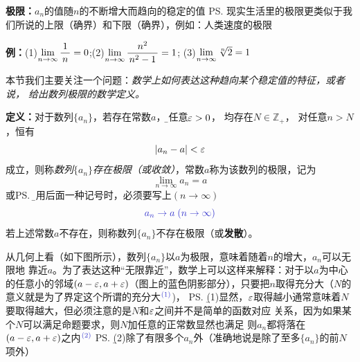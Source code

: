 {\bf 极限：}$a_n$的值随$n$的不断增大而趋向的稳定的值
\ps{现实生活里的极限更类似于我们所说的上限（确界）和下限（确界），例如：人类速度的极限} 

{\bf 例：}(1)$\lim\limits_{n\to\infty}\displaystyle\frac{\,{1}\,}{\,{n}\,}=0$;\quad(2)$\lim\limits_{n\to\infty}\displaystyle\frac{\,{n^2}\,}{\,{n^2-1}\,}=1$;
\quad(3)$\lim\limits_{n\to\infty}\sqrt[n]2=1$

\bigskip

本节我们主要关注一个问题：{\it 数学上如何表达这种趋向某个稳定值的特征，或者说，
给出数列极限的数学定义。}

{\bf 定义：}对于数列$\{a_n\}$，若存在常数$a$，{\b 对任意$\varepsilon>0$，
均存在$N\in\mathbb{Z}_+$，
对任意$n>N$，恒有
$$|a_n-a|<\varepsilon$$
成立}，则称{\it 数列$\{a_n\}$存在极限（或收敛）}，常数$a$称为该数列的极限，记为
$$\lim_{n\to\infty}a_n=a$$
或\ps{\b 使用后面一种记号时，必须要写上$(n\to\infty)$}
$${\b a_n\to a\;(n\to\infty)}$$
若上述常数$a$不存在，则称数列$\{a_n\}$不存在极限（或{\bf 发散}）。

从几何上看（如下图所示），数列$\{a_n\}$以$a$为极限，意味着随着$n$的增大，$a_n$可以无限地
靠近$a$。为了表达这种“无限靠近”，数学上可以这样来解释：对于以$a$为中心的任意小的邻域$(a-\varepsilon,
a+\varepsilon)$（图上的蓝色阴影部分），只要把$n$取得充分大（$N$的意义就是为了界定这个所谓的充分大$^{\b (1)}$)，
\ps{\b (1)显然，$\varepsilon$取得越小通常意味着$N$要取得越大，但必须注意的是$N$和$\varepsilon$之间并不是简单的函数对应
关系，因为如果某个$N$可以满足命题要求，则$N$加任意的正常数显然也满足}
则$a_n$都将落在$(a-\varepsilon,a+\varepsilon)$之内$^{\b (2)}$
\ps{\b (2)除了有限多个$a_n$外（准确地说是除了至多$\{a_n\}$的前$N$项外）}

